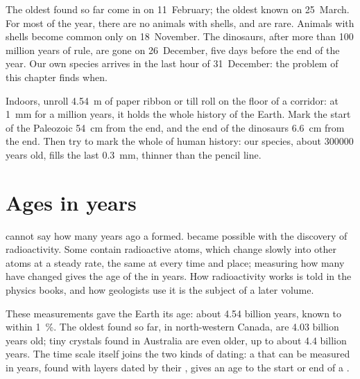 The oldest  found so far come in on 11~February; the oldest known
 on 25~March. For most of the year, there are no animals with
shells, and  are rare. Animals with shells become common only on
18~November. The dinosaurs, after more than \num{100} million years
of rule, are gone on 26~December, five days before the end of the
year. Our own species arrives in the last hour of 31~December: the
problem of this chapter finds when.

\begin{inthelab}
Indoors, unroll \qty{4.54}{m} of paper ribbon or till roll on the floor
of a corridor: at \qty{1}{mm} for a million years, it holds the whole
history of the Earth. Mark the start of the Paleozoic \qty{54}{cm} from
the end, and the end of the dinosaurs \qty{6.6}{cm} from the end. Then
try to mark the whole of human history: our species, about \num{300000}
years old, fills the last \qty{0.3}{mm}, thinner than the pencil line.
\end{inthelab}

\section{Ages in years}

 cannot say how many years ago a  formed.  became possible with the discovery of radioactivity. Some 
contain radioactive atoms, which change slowly into other atoms at a
steady rate, the same at every time and place; measuring how many have
changed gives the age of the  in years. How radioactivity works is
told in the physics books, and how geologists use it is the subject of a
later volume.

These measurements gave the Earth its age: about \num{4.54} billion
years, known to within 1~\%. The oldest  found so far,
in north-western Canada, are \num{4.03} billion years old; tiny crystals
found in Australia are even older, up to about \num{4.4} billion years.
The time scale itself joins the two kinds of dating: a  that can be
measured in years, found with layers dated by their , gives an
age to the start or end of a .

